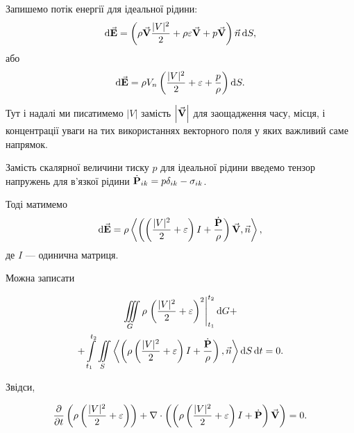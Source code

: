 Запишемо потік енергії для ідеальної рідини:
\begin{equation}
	\diff \vecf E = \left( \rho \vecf V \frac{|V|^2}{2} + \rho \epsilon \vecf V + p \vecf V\right) \vec n \diff S,
\end{equation}
або
\begin{equation}
	\diff \vecf E = \rho V_n \left( \frac{|V|^2}{2} + \epsilon + \frac{p}{\rho}\right)\diff S.
\end{equation}

\begin{remark}
	Тут і надалі ми писатимемо $|V|$ замість $\left|\vecf V\right|$ для заощадження часу, місця, і концентрації уваги на тих використаннях векторного поля у яких важливий саме напрямок.
\end{remark}

Замість скалярної величини тиску $p$ для ідеальної рідини введемо тензор напружень для в'язкої рідини $\dot{\bf{P}}_{ik} = p \delta_{ik} - \sigma_{ik}$. \medskip

Тоді матимемо 
\begin{equation}
	\diff \vecf E = \rho \langle\left(\left( \frac{|V|^2}{2} + \epsilon \right) I + \frac{\dot{\bf{P}}}{\rho} \right)\vecf V, \vec n \rangle,
\end{equation}
де $I$ --- одинична матриця. \medskip

Можна записати
\begin{law}
	\begin{multline}
		\Iiint_G \rho \left. \left( \frac{|V|^2}{2} + \epsilon\right)^2 \right|_{t_1}^{t_2} \diff G + \\
		+\Int_{t_1}^{t_2} \Iint_S \langle \left(\rho \left(\frac{|V|^2}{2} + \epsilon \right)I+\frac{\dot{\bf{P}}}{\rho}\right),\vec n\rangle \diff S \diff t = 0.
	\end{multline}
\end{law}

Звідси, 
\begin{law}
	\label{law:energy-conservation-viscous-liquid}
	\begin{equation}
		\label{eq:energy-conservation-viscous-liquid}
		\frac{\partial}{\partial t} \left( \rho \left( \frac{|V|^2}{2} + \epsilon\right)\right) + \nabla \cdot \left( \left( \rho \left(\frac{|V|^2}{2} + \epsilon\right)I + \dot{\bf{P}}\right) \vecf V \right) = 0.
	\end{equation}
\end{law}

